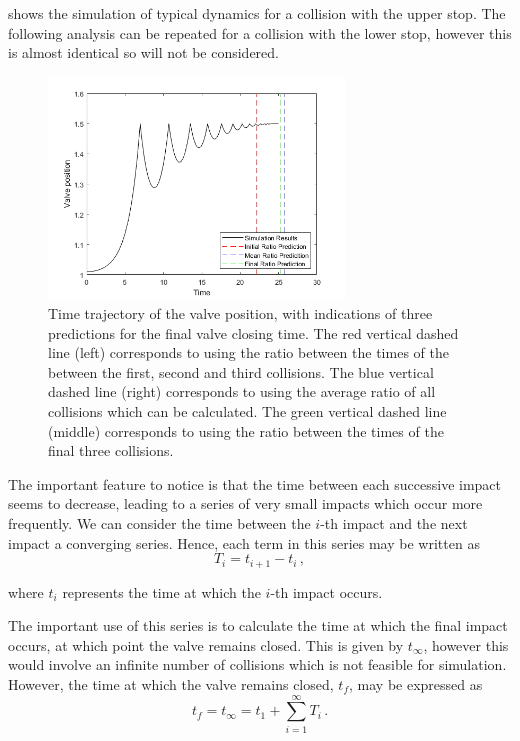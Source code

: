 shows the simulation of typical dynamics for a collision with the upper stop. The following analysis can be repeated for a collision with the lower stop, however this is almost identical so will not be considered.
~
\begin{figure}[ht]
    \centering
    \includegraphics[width=0.7\textwidth]{Figures/ImpactSeries/PositionTime.png}
    \caption{Time trajectory of the valve position, with indications of three predictions for the final valve closing time. The red vertical dashed line (left) corresponds to using the ratio between the times of the between the first, second and third collisions. The blue vertical dashed line (right) corresponds to using the average ratio of all collisions which can be calculated. The green vertical dashed line (middle) corresponds to using the ratio between the times of the final three collisions.}
    \label{fig: ImpactPos}
\end{figure}

The important feature to notice is that the time between each successive impact seems to decrease, leading to a series of very small impacts which occur more frequently. We can consider the time between the $i$-th impact and the next impact a converging series. Hence, each term in this series may be written as
~
\begin{equation*}
    T_i = t_{i+1} - t_{i} \, ,
\end{equation*}

where $t_i$ represents the time at which the $i$-th impact occurs.

The important use of this series is to calculate the time at which the final impact occurs, at which point the valve remains closed. This is given by $t_\infty$, however this would involve an infinite number of collisions which is not feasible for simulation. However, the time at which the valve remains closed, $t_f$, may be expressed as
~
\begin{equation*}
    t_f = t_\infty = t_1 + \sum^\infty_{i = 1} T_i \, .
\end{equation*}


